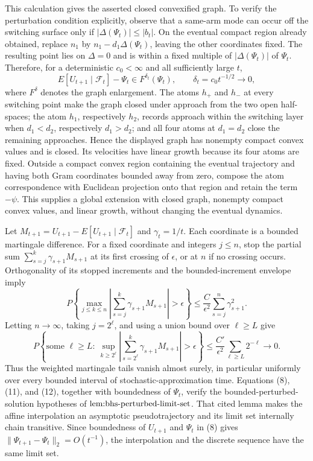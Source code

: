 This calculation gives the asserted closed convexified graph.  To verify the perturbation condition explicitly, observe that a same-arm mode can occur off the switching surface only if \(|\Delta(\Psi_t)|\leq |b_t|\).  On the eventual compact region already obtained, replace \(n_1\) by \(n_1-d_1\Delta(\Psi_t)\), leaving the other coordinates fixed.  The resulting point lies on \(\Delta=0\) and is within a fixed multiple of \(|\Delta(\Psi_t)|\) of \(\Psi_t\).  Therefore, for a deterministic \(c_0<\infty\) and all sufficiently large \(t\),
\[
 E[U_{t+1}\mid\mathcal F_t]-\Psi_t\in F^{\delta_t}(\Psi_t),
 \qquad \delta_t=c_0t^{-1/2}\longrightarrow0, \tag{11}
\]
where \(F^\delta\) denotes the graph enlargement.  The atoms \(h_+\) and \(h_-\) at every switching point make the graph closed under approach from the two open half-spaces; the atom \(h_1\), respectively \(h_2\), records approach within the switching layer when \(d_1<d_2\), respectively \(d_1>d_2\); and all four atoms at \(d_1=d_2\) close the remaining approaches.  Hence the displayed graph has nonempty compact convex values and is closed.  Its velocities have linear growth because its four atoms are fixed.  Outside a compact convex region containing the eventual trajectory and having both Gram coordinates bounded away from zero, compose the atom correspondence with Euclidean projection onto that region and retain the term \(-\psi\).  This supplies a global extension with closed graph, nonempty compact convex values, and linear growth, without changing the eventual dynamics.

Let \(M_{t+1}=U_{t+1}-E[U_{t+1}\mid\mathcal F_t]\) and \(\gamma_t=1/t\).  Each coordinate is a bounded martingale difference.  For a fixed coordinate and integers \(j\leq n\), stop the partial sum \(\sum_{s=j}^k\gamma_{s+1}M_{s+1}\) at its first crossing of \(\epsilon\), or at \(n\) if no crossing occurs.  Orthogonality of its stopped increments and the bounded-increment envelope imply
\[
 P\left\{\max_{j\leq k\leq n}\left|\sum_{s=j}^k\gamma_{s+1}M_{s+1}\right|>\epsilon\right\}
 \leq \frac{C}{\epsilon^2}\sum_{s=j}^n\gamma_{s+1}^2.
\]
Letting \(n\to\infty\), taking \(j=2^\ell\), and using a union bound over \(\ell\geq L\) give
\[
 P\left\{\text{some }\ell\geq L:\ 
 \sup_{k\geq2^\ell}\left|\sum_{s=2^\ell}^k\gamma_{s+1}M_{s+1}\right|>\epsilon\right\}
 \leq \frac{C'}{\epsilon^2}\sum_{\ell\geq L}2^{-\ell}\longrightarrow0. \tag{12}
\]
Thus the weighted martingale tails vanish almost surely, in particular uniformly over every bounded interval of stochastic-approximation time.  Equations (8), (11), and (12), together with boundedness of \(\Psi_t\), verify the bounded-perturbed-solution hypotheses of \(\textnormal{lem:bhs-perturbed-limit-set}\).  That cited lemma makes the affine interpolation an asymptotic pseudotrajectory and its limit set internally chain transitive.  Since boundedness of \(U_{t+1}\) and \(\Psi_t\) in (8) gives \(\|\Psi_{t+1}-\Psi_t\|_2=O(t^{-1})\), the interpolation and the discrete sequence have the same limit set.

